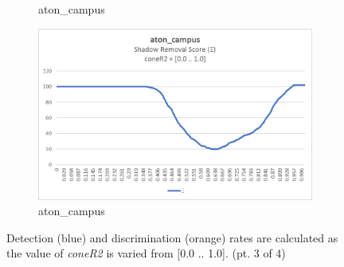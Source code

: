 \begin{appendices}
\begin{figure}
\begin{subfigure}{.45\linewidth}
  \caption{aton\_campus}
\end{subfigure}
\hfill
\begin{subfigure}{.45\linewidth}
  \includegraphics[width=1\linewidth]{figures/appendix/campus_coneR2_score.jpg}
  \caption{aton\_campus}
\end{subfigure}

\caption{Detection (blue) and discrimination (orange) rates are calculated as the value of \textit{coneR2} is varied from [0.0 .. 1.0]. (pt. 3 of 4)}
\end{figure}


\end{appendices}
